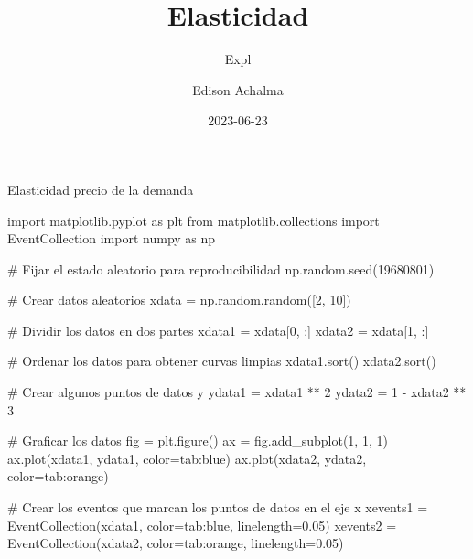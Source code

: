 \documentclass[
  a4paper,
]{article}
\title{Elasticidad}
\subtitle{Expl}
\author{Edison Achalma}
\date{2023-06-23}
\newenvironment{Shaded}{}{}
\newcommand{\CommentTok}[1]{\textcolor[rgb]{0.42,0.45,0.49}{#1}}
\newcommand{\DecValTok}[1]{\textcolor[rgb]{0.00,0.36,0.77}{#1}}
\newcommand{\FloatTok}[1]{\textcolor[rgb]{0.00,0.36,0.77}{#1}}
\newcommand{\ImportTok}[1]{\textcolor[rgb]{0.01,0.18,0.38}{#1}}
\newcommand{\NormalTok}[1]{\textcolor[rgb]{0.14,0.16,0.18}{#1}}
\newcommand{\OperatorTok}[1]{\textcolor[rgb]{0.14,0.16,0.18}{#1}}
\newcommand{\StringTok}[1]{\textcolor[rgb]{0.01,0.18,0.38}{#1}}
\begin{document}
\maketitle
\ifdefined\Shaded\renewenvironment{Shaded}{\begin{tcolorbox}[breakable, frame hidden, interior hidden, boxrule=0pt, borderline west={3pt}{0pt}{shadecolor}, enhanced, sharp corners]}{\end{tcolorbox}}\fi

Elasticidad precio de la demanda

\begin{Shaded}
\begin{Highlighting}[]
\ImportTok{import}\NormalTok{ matplotlib.pyplot }\ImportTok{as}\NormalTok{ plt}
\ImportTok{from}\NormalTok{ matplotlib.collections }\ImportTok{import}\NormalTok{ EventCollection}
\ImportTok{import}\NormalTok{ numpy }\ImportTok{as}\NormalTok{ np}

\CommentTok{\# Fijar el estado aleatorio para reproducibilidad}
\NormalTok{np.random.seed(}\DecValTok{19680801}\NormalTok{)}

\CommentTok{\# Crear datos aleatorios}
\NormalTok{xdata }\OperatorTok{=}\NormalTok{ np.random.random([}\DecValTok{2}\NormalTok{, }\DecValTok{10}\NormalTok{])}

\CommentTok{\# Dividir los datos en dos partes}
\NormalTok{xdata1 }\OperatorTok{=}\NormalTok{ xdata[}\DecValTok{0}\NormalTok{, :]}
\NormalTok{xdata2 }\OperatorTok{=}\NormalTok{ xdata[}\DecValTok{1}\NormalTok{, :]}

\CommentTok{\# Ordenar los datos para obtener curvas limpias}
\NormalTok{xdata1.sort()}
\NormalTok{xdata2.sort()}

\CommentTok{\# Crear algunos puntos de datos y}
\NormalTok{ydata1 }\OperatorTok{=}\NormalTok{ xdata1 }\OperatorTok{**} \DecValTok{2}
\NormalTok{ydata2 }\OperatorTok{=} \DecValTok{1} \OperatorTok{{-}}\NormalTok{ xdata2 }\OperatorTok{**} \DecValTok{3}

\CommentTok{\# Graficar los datos}
\NormalTok{fig }\OperatorTok{=}\NormalTok{ plt.figure()}
\NormalTok{ax }\OperatorTok{=}\NormalTok{ fig.add\_subplot(}\DecValTok{1}\NormalTok{, }\DecValTok{1}\NormalTok{, }\DecValTok{1}\NormalTok{)}
\NormalTok{ax.plot(xdata1, ydata1, color}\OperatorTok{=}\StringTok{\textquotesingle{}tab:blue\textquotesingle{}}\NormalTok{)}
\NormalTok{ax.plot(xdata2, ydata2, color}\OperatorTok{=}\StringTok{\textquotesingle{}tab:orange\textquotesingle{}}\NormalTok{)}

\CommentTok{\# Crear los eventos que marcan los puntos de datos en el eje x}
\NormalTok{xevents1 }\OperatorTok{=}\NormalTok{ EventCollection(xdata1, color}\OperatorTok{=}\StringTok{\textquotesingle{}tab:blue\textquotesingle{}}\NormalTok{, linelength}\OperatorTok{=}\FloatTok{0.05}\NormalTok{)}
\NormalTok{xevents2 }\OperatorTok{=}\NormalTok{ EventCollection(xdata2, color}\OperatorTok{=}\StringTok{\textquotesingle{}tab:orange\textquotesingle{}}\NormalTok{, linelength}\OperatorTok{=}\FloatTok{0.05}\NormalTok{)}


\end{Highlighting}
\end{Shaded}
\end{document}
